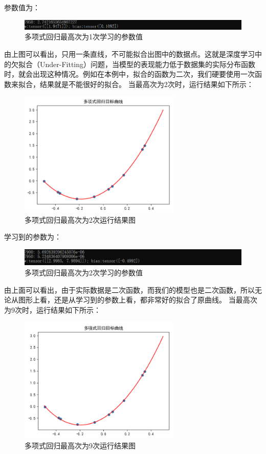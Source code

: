 \documentclass[UTF8]{article}
\begin{document}
参数值为：
\begin{figure}[H]
	\caption{多项式回归最高次为1次学习的参数值}
	\label{f000018}
	\centering
	\includegraphics[width=15cm]{images/f000018}
\end{figure}
由上图可以看出，只用一条直线，不可能拟合出图中的数据点。这就是深度学习中的欠拟合（Under-Fitting）问题，当模型的表现能力低于数据集的实际分布函数时，就会出现这种情况。例如在本例中，拟合的函数为二次，我们硬要使用一次函数来拟合，结果就是不能很好的拟合。\newline
当最高次为2次时，运行结果如下所示：
\begin{figure}[H]
	\caption{多项式回归最高次为2次运行结果图}
	\label{f000019}
	\centering
	\includegraphics[height=6cm]{images/f000019}
\end{figure}
学习到的参数为：
\begin{figure}[H]
	\caption{多项式回归最高次为2次学习的参数值}
	\label{f000020}
	\centering
	\includegraphics[width=15cm]{images/f000020}
\end{figure}
由上面可以看出，由于实际数据是二次函数，而我们的模型也是二次函数，所以无论从图形上看，还是从学习到的参数上看，都非常好的拟合了原曲线。
当最高次为9次时，运行结果如下所示：
\begin{figure}[H]
	\caption{多项式回归最高次为9次运行结果图}
	\label{f000021}
	\centering
	\includegraphics[height=6cm]{images/f000021}
\end{figure}
\end{document}
